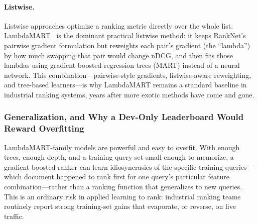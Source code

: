 \documentclass[10pt]{article}
\begin{document}
\paragraph{Listwise.}
Listwise approaches optimize a ranking metric directly over the whole list. LambdaMART~\cite{burges2010,wu2010} is the dominant practical listwise method: it keeps RankNet's pairwise gradient formulation but reweights each pair's gradient (the ``lambda'') by how much swapping that pair would change nDCG, and then fits those lambdas using gradient-boosted regression trees (MART) instead of a neural network. This combination---pairwise-style gradients, listwise-aware reweighting, and tree-based learners---is why LambdaMART remains a standard baseline in industrial ranking systems, years after more exotic methods have come and gone.

%


\subsubsection{Generalization, and Why a Dev-Only Leaderboard Would Reward Overfitting}

LambdaMART-family models are powerful and easy to overfit. With enough trees, enough depth, and a training query set small enough to memorize, a gradient-boosted ranker can learn idiosyncrasies of the specific training queries---which document happened to rank first for one query's particular feature combination---rather than a ranking function that generalizes to new queries. This is an ordinary risk in applied learning to rank: industrial ranking teams routinely report strong training-set gains that evaporate, or reverse, on live traffic.
\end{document}
